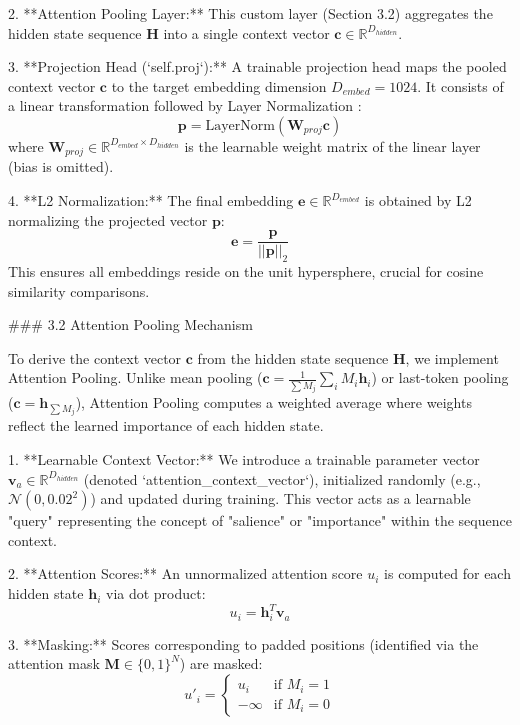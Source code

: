 2.  **Attention Pooling Layer:** This custom layer (Section 3.2) aggregates the hidden state sequence $\mathbf{H}$ into a single context vector $\mathbf{c} \in \mathbb{R}^{D_{hidden}}$.

3.  **Projection Head (`self.proj`):** A trainable projection head maps the pooled context vector $\mathbf{c}$ to the target embedding dimension $D_{embed}=1024$. It consists of a linear transformation followed by Layer Normalization \cite{ba2016layer}:
    $$ \mathbf{p} = \text{LayerNorm}(\mathbf{W}_{proj} \mathbf{c}) $$
    where $\mathbf{W}_{proj} \in \mathbb{R}^{D_{embed} \times D_{hidden}}$ is the learnable weight matrix of the linear layer (bias is omitted).

4.  **L2 Normalization:** The final embedding $\mathbf{e} \in \mathbb{R}^{D_{embed}}$ is obtained by L2 normalizing the projected vector $\mathbf{p}$:
    $$ \mathbf{e} = \frac{\mathbf{p}}{||\mathbf{p}||_2} $$
    This ensures all embeddings reside on the unit hypersphere, crucial for cosine similarity comparisons.

### 3.2 Attention Pooling Mechanism

To derive the context vector $\mathbf{c}$ from the hidden state sequence $\mathbf{H}$, we implement Attention Pooling. Unlike mean pooling ($\mathbf{c} = \frac{1}{\sum M_j}\sum_{i} M_i \mathbf{h}_i$) or last-token pooling ($\mathbf{c} = \mathbf{h}_{\sum M_j}$), Attention Pooling computes a weighted average where weights reflect the learned importance of each hidden state.

1.  **Learnable Context Vector:** We introduce a trainable parameter vector $\mathbf{v}_a \in \mathbb{R}^{D_{hidden}}$ (denoted `attention_context_vector`), initialized randomly (e.g., $\mathcal{N}(0, 0.02^2)$) and updated during training. This vector acts as a learnable "query" representing the concept of "salience" or "importance" within the sequence context.

2.  **Attention Scores:** An unnormalized attention score $u_i$ is computed for each hidden state $\mathbf{h}_i$ via dot product:
    $$ u_i = \mathbf{h}_i^T \mathbf{v}_a $$

3.  **Masking:** Scores corresponding to padded positions (identified via the attention mask $\mathbf{M} \in \{0, 1\}^N$) are masked:
    $$ u'_i = \begin{cases} u_i & \text{if } M_i = 1 \\ -\infty & \text{if } M_i = 0 \end{cases} $$

